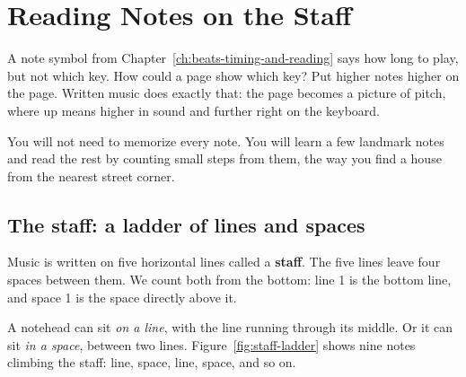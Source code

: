 \chapter{Reading Notes on the Staff}
\label{ch:reading-the-staff}
\chapterline

A note symbol from Chapter~\ref{ch:beats-timing-and-reading} says how long to play, but not which key. How could a page show which key? Put higher notes higher on the page. Written music does exactly that: the page becomes a picture of pitch, where up means higher in sound and further right on the keyboard.

You will not need to memorize every note. You will learn a few landmark notes and read the rest by counting small steps from them, the way you find a house from the nearest street corner.

\section{The staff: a ladder of lines and spaces}

Music is written on five horizontal lines called a \textbf{staff}. The five lines leave four spaces between them. We count both from the bottom: line 1 is the bottom line, and space 1 is the space directly above it.

A notehead can sit \emph{on a line}, with the line running through its middle. Or it can sit \emph{in a space}, between two lines. Figure~\ref{fig:staff-ladder} shows nine notes climbing the staff: line, space, line, space, and so on.


